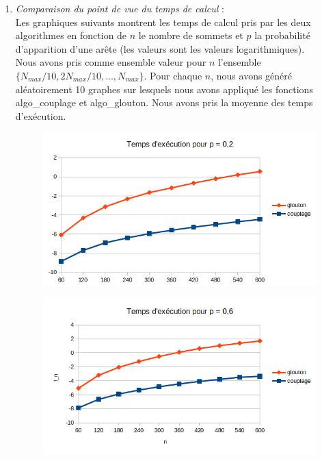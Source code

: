 \documentclass[12pt]{article}
\begin{document}
        \begin{enumerate}
            \item \textit{Comparaison du point de vue du temps de calcul} : \\
            Les graphiques suivants montrent les temps de calcul pris par les deux algorithmes en fonction de $n$ le nombre de sommets et $p$ la probabilité d'apparition d'une arête (les valeurs sont les valeurs logarithmiques). \\
            Nous avons pris comme ensemble valeur pour $n$ l'ensemble $\{N_{max}/10, 2N_{max}/10,..., N_{max}\}$. Pour chaque $n$, nous avons généré aléatoirement 10 graphes sur lesquels nous avons appliqué les fonctions algo\_couplage et algo\_glouton. Nous avons pris la moyenne des temps d'exécution. \\

                \begin{figure}[h]
                    \includegraphics[scale=0.7]{figures/p2.png}
                    \centering
                \end{figure}

                \begin{figure}[h]
                    \includegraphics[scale=0.7]{figures/p6.png}
                    \centering
                \end{figure}


\end{enumerate}
\end{document}
